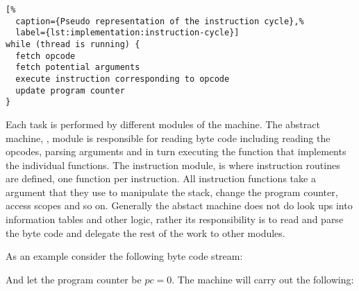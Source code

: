 \begin{lstlisting}[%
  caption={Pseudo representation of the instruction cycle},%
  label={lst:implementation:instruction-cycle}]
while (thread is running) {
  fetch opcode
  fetch potential arguments
  execute instruction corresponding to opcode
  update program counter
}
\end{lstlisting}

Each task is performed by different modules of the machine. The abstract
machine, , module is responsible for reading byte code including
reading the opcodes, parsing arguments and in turn executing the function that
implements the individual functions. The instruction module,
 is where instruction routines are defined, one function
per instruction. All instruction functions take a  argument
that they use to manipulate the stack, change the program counter, access scopes
and so on. Generally the abstact machine does not do look ups into information
tables and other logic, rather its responsibility is to read and parse the byte
code and delegate the rest of the work to other modules.

As an example consider the following byte code stream:


And let the program counter be $pc = 0$. The machine will carry out the following:

